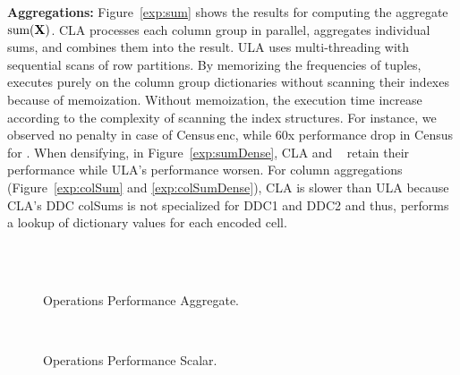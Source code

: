 \textbf{Aggregations:} Figure~\ref{exp:sum} shows the results for computing the aggregate $\text{sum}(\mathbf{X})$. CLA processes each column group in parallel, aggregates individual sums, and combines them into the result. ULA uses multi-threading with sequential scans of row partitions.
By memorizing the frequencies of tuples, \name~ executes purely on the column group dictionaries without scanning their indexes because of memoization.
Without memoization, the execution time increase according to the complexity of scanning the index structures.
For instance, we observed no penalty in case of Census\,enc, while 60x performance drop in Census for \name.
When densifying, in Figure~\ref{exp:sumDense}, CLA and \name~ retain their performance while ULA's performance worsen.
For column aggregations (Figure~\ref{exp:colSum} and \ref{exp:colSumDense}), CLA is slower than ULA because CLA's DDC colSums is not specialized for DDC1 and DDC2 and thus, performs a lookup of dictionary values for each encoded cell.

\begin{figure}[!t]
	\centering
	\hfill
	\hfill~\vspace{-0.3cm}\\
	\hfill
	~\vspace{-0.4cm}\\
	\caption{\label{exp:opsua}Operations Performance Aggregate.}
  \vspace{-0.4cm}
\end{figure}

\begin{figure}[!t]
	\hfill
	~\vspace{-0.4cm}\\
	\caption{\label{exp:opsscalar}Operations Performance Scalar.}
\vspace{-0.4cm}
\end{figure}


